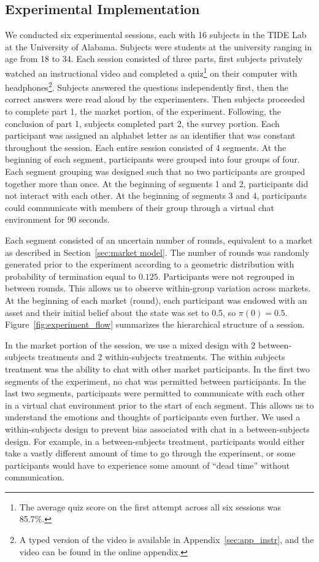 \documentclass[thesis]{uathesis}
\begin{document}
\begin{body}
\section{Experimental Implementation}
We conducted six experimental sessions, each with 16 subjects in the TIDE Lab at the University of Alabama. Subjects were students at the university ranging in age from 18 to 34. Each session consisted of three parts, first subjects privately watched an instructional video and completed a quiz\footnote{The average quiz score on the first attempt across all six sessions was 85.7\%.} on their computer with headphones\footnote{A typed version of the video is available in Appendix~\ref{sec:app_instr}, and the video can be found in the online appendix.}. Subjects answered the questions independently first, then the correct answers were read aloud by the experimenters. Then subjects proceeded to complete part 1, the market portion, of the experiment. Following, the conclusion of part 1, subjects completed part 2, the survey portion.
Each participant was assigned an alphabet letter as an identifier that was constant throughout the session. Each entire session consisted of 4 segments. At the beginning of each segment, participants were grouped into four groups of four. Each segment grouping was designed such that no two participants are grouped together more than once. At the beginning of segments 1 and 2, participants did not interact with each other. At the beginning of segments 3 and 4, participants could communicate with members of their group through a virtual chat environment for 90 seconds.

Each segment consisted of an uncertain number of rounds, equivalent to a market as described in Section~\ref{sec:market model}. The number of rounds was randomly generated prior to the experiment according to a geometric distribution with probability of termination equal to $0.125$. Participants were not regrouped in between rounds. This allows us to observe within-group variation across markets. At the beginning of each market (round), each participant was endowed with an asset and their initial belief about the state was set to 0.5, so $\pi(0) = 0.5$. Figure~\ref{fig:experiment_flow} summarizes the hierarchical structure of a session.



In the market portion of the session, we use a mixed design with 2 between-subjects treatments and 2 within-subjects treatments. The within subjects treatment was the ability to chat with other market participants. In the first two segments of the experiment, no chat was permitted between participants. In the last two segments, participants were permitted to communicate with each other in a virtual chat environment prior to the start of each segment. This allows us to understand the emotions and thoughts of participants even further. We used a within-subjects design to prevent bias associated with chat in a between-subjects design. For example, in a between-subjects treatment, participants would either take a vastly different amount of time to go through the experiment, or some participants would have to experience some amount of ``dead time'' without communication.


\end{body}
\end{document}
